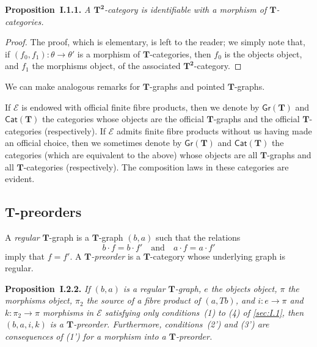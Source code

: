 \documentclass[fleqn]{article}
\newenvironment{itenv}[1]
  {\phantomsection\par\medskip\noindent\textbf{#1.}\itshape}
  {\par\medskip}
\newcommand{\oldpage}[1]{\marginpar{\footnotesize$\Big\vert$ \textit{p.~#1}}}
\newcommand{\TT}{\mathbf{T}}
\newcommand{\textand}{\quad\text{and}\quad}
\newcommand{\cat}[1]{\mathcal{#1}}
\newcommand{\Cat}[1]{\mathsf{#1}}
\newcommand{\Gr}[1]{\Cat{Gr}(#1)}
\begin{document}
\begin{itenv}{Proposition~I.1.1}
  A $\TT^\mathbf{2}$-category is identifiable with a morphism of $\TT$-categories.
\end{itenv}

\begin{proof}
  The proof, which is elementary, is left to the reader;
  we simply note that, if $(f_0,f_1)\colon\theta\to\theta'$ is a morphism of $\TT$-categories, then $f_0$ is the objects object, and $f_1$ the morphisms object, of the associated $\TT^\mathbf{2}$-category.
\end{proof}

We can make analogous remarks for $\TT$-graphs and pointed $\TT$-graphs.

\oldpage{229}
If $\cat{E}$ is endowed with official finite fibre products, then we denote by $\Gr{\TT}$ and $\Cat{Cat}(\TT)$ the categories whose objects are the official $\TT$-graphs and the official $\TT$-categories (respectively).
If $\cat{E}$ admits finite fibre products without us having made an official choice, then we sometimes denote by $\Gr{\TT}$ and $\Cat{Cat}(\TT)$ the categories (which are equivalent to the above) whose objects are all $\TT$-graphs and all $\TT$-categories (respectively).
The composition laws in these categories are evident.


\subsection{$\TT$-preorders}
\label{sec:I.2}

A \emph{regular} $\TT$-graph is a $\TT$-graph $(b,a)$ such that the relations
\[
  b\cdot f = b\cdot f'
  \textand
  a\cdot f = a\cdot f'
\]
imply that $f=f'$.
A \emph{$\TT$-preorder} is a $\TT$-category whose underlying graph is regular.

\begin{itenv}{Proposition~I.2.2}
  If $(b,a)$ is a regular $\TT$-graph, $e$ the objects object, $\pi$ the morphisms object, $\pi_2$ the source of a fibre product of $(a,Tb)$, and $i\colon e\to\pi$ and $k\colon\pi_2\to\pi$ morphisms in $\cat{E}$ satisfying only conditions~(1) to (4) of \cref{sec:I.1}, then $(b,a,i,k)$ is a $\TT$-preorder.
  Furthermore, conditions~(2') and (3') are consequences of (1') for a morphism into a $\TT$-preorder.
\end{itenv}
\end{document}
